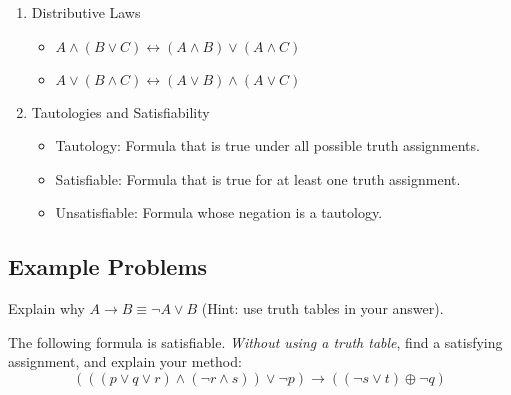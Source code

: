 \documentclass[solution, letterpaper]{cs20}
\begin{document}
\begin{enumerate}
        \item Distributive Laws
          \begin{itemize}
            \item $A \land (B \lor C) \longleftrightarrow (A \land B) \lor (A \land C)$
             \item $A \lor (B \land C) \longleftrightarrow (A \lor B) \land (A \lor C)$
          \end{itemize}

        \item Tautologies and Satisfiability
          \begin{itemize}
            \item Tautology:  Formula that is true under all possible truth assignments.
            \item Satisfiable:  Formula that is true for at least one truth assignment.
            \item Unsatisfiable:  Formula whose negation is a tautology.
          \end{itemize}

        \end{enumerate}


    \subsection{Example Problems}


        \subproblem Explain why $A \rightarrow B \equiv \lnot A \lor B$ (Hint: use truth tables in your answer).

        \subproblem The following formula is satisfiable.  \emph{Without using a truth table}, find a satisfying assignment, and explain your method:
        	$$(((p \lor q \lor r) \land (\neg r \land s)) \lor \neg p) \rightarrow ((\neg s \lor t) \oplus \neg q) $$
\end{document}
